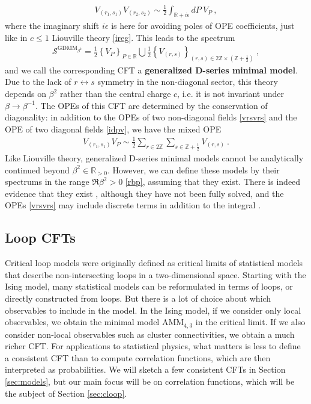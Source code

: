 \documentclass[12pt, a4paper]{article}
\theoremstyle{break}
\begin{document}
\begin{align}
 V_{(r_1,s_1)}V_{(r_2,s_2)} \sim \frac12 \int_{\mathbb{R}+i\epsilon} dP\ V_P\ ,
 \label{vrsvrs}
\end{align}
where the imaginary shift $i\epsilon$ is here for avoiding poles of OPE coefficients, just like in $c\leq 1$ Liouville theory \eqref{ireg}. This leads to the spectrum
\begin{align}
\boxed{\mathcal{S}^{\text{GDMM}_{\beta^2}} = \frac12 \left\{V_P\right\}_{P\in \mathbb{R}} \bigcup  \frac12\left\{V_{(r,s)} \right\}_{ (r,s)\in 2\mathbb{Z}\times (\mathbb{Z}+\frac12)}  }\ ,
\end{align}
and we call the corresponding CFT a \textbf{generalized D-series minimal model}. Due to the lack of $r\leftrightarrow s$ symmetry in the non-diagonal sector, this theory depends on $\beta^2$ rather than the central charge $c$, i.e. it is not invariant under $\beta \to \beta^{-1}$. 
The OPEs of this CFT are determined by the conservation of diagonality: in addition to the OPEs of two non-diagonal fields \eqref{vrsvrs} and the OPE of two diagonal fields \eqref{idpv}, we have the mixed OPE 
\begin{align}
 V_{(r_1,s_1)}V_P \sim \frac12 \sum_{r\in 2\mathbb{Z}}\sum_{s\in \mathbb{Z}+\frac12} V_{(r,s)} \ . 
\end{align}
Like Liouville theory, generalized D-series minimal models cannot be analytically continued beyond $\beta^2\in \mathbb{R}_{>0}$. However, we can define these models by their spectrums in the range $\Re\beta^2>0$ \eqref{rbp}, assuming that they exist. There is indeed evidence that they exist \cite{mr17}, although they have not been fully solved, and the OPEs \eqref{vrsvrs} may include discrete terms in addition to the integral \cite{rib19}. 


\subsection{Loop CFTs}

Critical loop models were originally defined as critical limits of statistical models that describe non-intersecting loops in a two-dimensional space. Starting with the Ising model, many statistical models can be reformulated in terms of loops, or directly constructed from loops. But there is a lot of choice about which observables to include in the model. In the Ising model, if we consider only local observables, we obtain the minimal model $\text{AMM}_{4,3}$ in the critical limit. If we also consider non-local observables such as cluster connectivities, we obtain a much richer CFT. For applications to statistical physics, what matters is less to define a consistent CFT than to compute correlation functions, which are then interpreted as probabilities. We will sketch a few consistent CFTs in Section \ref{sec:models}, but our main focus will be on correlation functions, which will be the subject of Section \ref{sec:cloop}.
\end{document}
